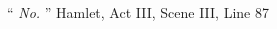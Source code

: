 \documentclass[12pt,a4paper,twoside,openright,justified]{book}
\begin{document}
\pagestyle{empty}



\cleardoublepage
{
\vspace*{0.2\textheight}
\large
\noindent\hfill\enquote{\itshape 
No.
{}}
\bigbreak
}
\large
\hfill Hamlet, Act III, Scene III, Line 87
\normalsize


\justifying

\setlength{\skip\footins}{8mm}

\setlength{\parindent}{0pt}
\setlength{\parskip}{2mm}







\frontmatter
\begin{spacing}{1.3}
\pagestyle{toclof}
\tableofcontents  %
\clearpage
\end{spacing}


\mainmatter











%


%

%
\end{document}
